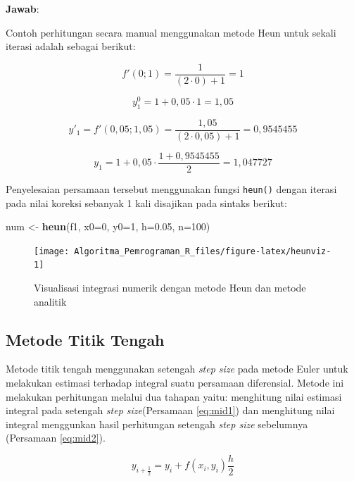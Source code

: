 \documentclass[
]{book}
\newenvironment{Shaded}{\begin{snugshade}}{\end{snugshade}}
\newcommand{\AttributeTok}[1]{\textcolor[rgb]{0.13,0.29,0.53}{#1}}
\newcommand{\DecValTok}[1]{\textcolor[rgb]{0.00,0.00,0.81}{#1}}
\newcommand{\FloatTok}[1]{\textcolor[rgb]{0.00,0.00,0.81}{#1}}
\newcommand{\FunctionTok}[1]{\textcolor[rgb]{0.13,0.29,0.53}{\textbf{#1}}}
\newcommand{\NormalTok}[1]{#1}
\newcommand{\OtherTok}[1]{\textcolor[rgb]{0.56,0.35,0.01}{#1}}
\theoremstyle{definition}
\theoremstyle{definition}
\theoremstyle{definition}
\theoremstyle{definition}
\theoremstyle{remark}
\begin{document}
\textbf{Jawab}:

Contoh perhitungan secara manual menggunakan metode Heun untuk sekali iterasi adalah sebagai berikut:

\[
f'\left(0;1\right)=\frac{1}{\left(2\cdot 0\right)+1}=1
\]

\[
y_{1}^0=1+0,05\cdot1=1,05
\]

\[
y'_1=f'\left(0,05;1,05\right)=\frac{1,05}{\left(2\cdot 0,05\right)+1}=0,9545455
\]

\[
y_1=1+0,05\cdot\frac{1+0,9545455}{2}=1,047727
\]

Penyelesaian persamaan tersebut menggunakan fungsi \texttt{heun()} dengan iterasi pada nilai koreksi sebanyak 1 kali disajikan pada sintaks berikut:

\begin{Shaded}
\begin{Highlighting}[]
\NormalTok{num }\OtherTok{\textless{}{-}} \FunctionTok{heun}\NormalTok{(f1, }\AttributeTok{x0=}\DecValTok{0}\NormalTok{, }\AttributeTok{y0=}\DecValTok{1}\NormalTok{, }\AttributeTok{h=}\FloatTok{0.05}\NormalTok{, }\AttributeTok{n=}\DecValTok{100}\NormalTok{)}
\end{Highlighting}
\end{Shaded}

\begin{figure}

{\centering \texttt{[image: Algoritma\_Pemrograman\_R\_files/figure-latex/heunviz-1]} 

}

\caption{Visualisasi integrasi numerik dengan metode Heun dan metode analitik}\label{fig:heunviz}
\end{figure}

\hypertarget{midpt}{%
\subsection{Metode Titik Tengah}\label{midpt}}

Metode titik tengah menggunakan setengah \emph{step size} pada metode Euler untuk melakukan estimasi terhadap integral suatu persamaan diferensial. Metode ini melakukan perhitungan melalui dua tahapan yaitu: menghitung nilai estimasi integral pada setengah \emph{step size}(Persamaan \eqref{eq:mid1}) dan menghitung nilai integral menggunkan hasil perhitungan setengah \emph{step size} sebelumnya (Persamaan \eqref{eq:mid2}).

\begin{equation}
y_{i+\frac{1}{2}}=y_i+f\left(x_i,y_i\right)\frac{h}{2}
  \label{eq:mid1}
\end{equation}
\end{document}
